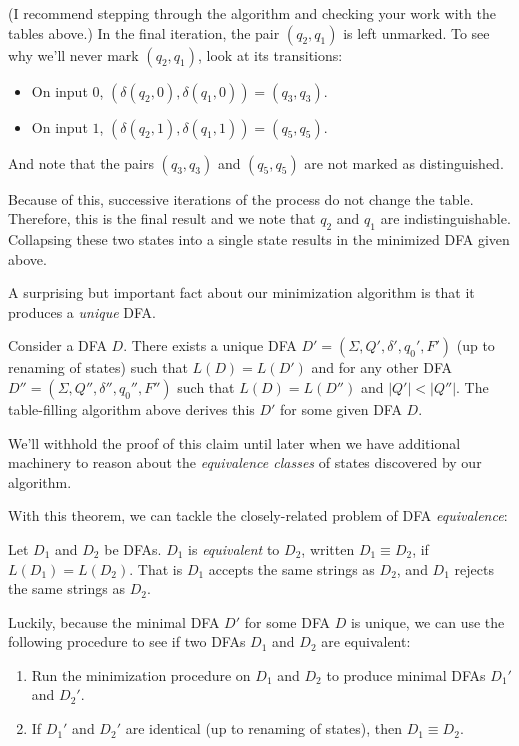 \documentclass[11pt]{book}
\begin{document}
\vspace{1em}

(I recommend stepping through the algorithm and checking your work with the tables above.)
In the final iteration, the pair $(q_2, q_1)$ is left unmarked.
To see why we'll never mark $(q_2, q_1)$, look at its transitions:
\begin{itemize}[itemsep=0pt]
  \item On input $0$, $(\delta(q_2, 0), \delta(q_1, 0)) = (q_3, q_3)$.
  \item On input $1$, $(\delta(q_2, 1), \delta(q_1, 1)) = (q_5, q_5)$.
\end{itemize}
And note that the pairs $(q_3, q_3)$ and $(q_5, q_5)$ are not marked as distinguished.

Because of this, successive iterations of the process do not change the table.
Therefore, this is the final result and we note that $q_2$ and $q_1$ are indistinguishable.
Collapsing these two states into a single state results in the minimized DFA given above.

A surprising but important fact about our minimization algorithm is that it produces a \emph{unique} DFA.
\begin{thm}
  Consider a DFA $D$.
  There exists a unique DFA $D' = (\Sigma, Q', \delta', q_0', F')$ (up to renaming of states) such that $L(D) = L(D')$ and for any other DFA $D'' = (\Sigma, Q'', \delta'', q_0'', F'')$ such that $L(D) = L(D'')$ and $|Q'| < |Q''|$.
  The table-filling algorithm above derives this $D'$ for some given DFA $D$.
\end{thm}
We'll withhold the proof of this claim until later when we have additional machinery to reason about the \emph{equivalence classes} of states discovered by our algorithm.

With this theorem, we can tackle the closely-related problem of DFA \emph{equivalence}:
\begin{defn}
  Let $D_1$ and $D_2$ be DFAs.
  $D_1$ is \emph{equivalent} to $D_2$, written $D_1 \equiv D_2$, if $L(D_1) = L(D_2)$.
  That is $D_1$ accepts the same strings as $D_2$, and $D_1$ rejects the same strings as $D_2$.
\end{defn}
Luckily, because the minimal DFA $D'$ for some DFA $D$ is unique, we can use the following procedure to see if two DFAs $D_1$ and $D_2$ are equivalent:
\begin{enumerate}
  \item Run the minimization procedure on $D_1$ and $D_2$ to produce minimal DFAs $D_1'$ and $D_2'$.
  \item If $D_1'$ and $D_2'$ are identical (up to renaming of states), then $D_1 \equiv D_2$.
\end{enumerate}
\end{document}

